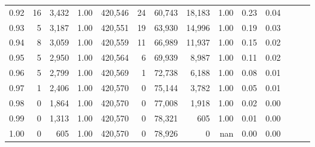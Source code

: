 \begin{tabular}{rrrrrrrrrrrrrr}
0.92 &     16 &  3,432 &  1.00 &  420,546 &       24 &  60,743 &  18,183 &  1.00 &  0.23 &      0.04 \\
0.93 &      5 &  3,187 &  1.00 &  420,551 &       19 &  63,930 &  14,996 &  1.00 &  0.19 &      0.03 \\
0.94 &      8 &  3,059 &  1.00 &  420,559 &       11 &  66,989 &  11,937 &  1.00 &  0.15 &      0.02 \\
0.95 &      5 &  2,950 &  1.00 &  420,564 &        6 &  69,939 &   8,987 &  1.00 &  0.11 &      0.02 \\
0.96 &      5 &  2,799 &  1.00 &  420,569 &        1 &  72,738 &   6,188 &  1.00 &  0.08 &      0.01 \\
0.97 &      1 &  2,406 &  1.00 &  420,570 &        0 &  75,144 &   3,782 &  1.00 &  0.05 &      0.01 \\
0.98 &      0 &  1,864 &  1.00 &  420,570 &        0 &  77,008 &   1,918 &  1.00 &  0.02 &      0.00 \\
0.99 &      0 &  1,313 &  1.00 &  420,570 &        0 &  78,321 &     605 &  1.00 &  0.01 &      0.00 \\
1.00 &      0 &    605 &  1.00 &  420,570 &        0 &  78,926 &       0 &   nan &  0.00 &      0.00 \\
\bottomrule
\end{tabular}

